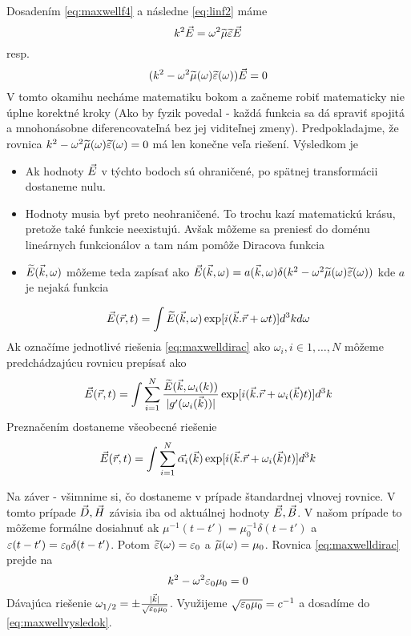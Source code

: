 Dosadením \ref{eq:maxwellf4} a následne \ref{eq:linf2} máme
\begin{equation*}
  k^2 \vec{E} = \omega^2 \widetilde{\mu}\widetilde{\varepsilon} \vec{E}    
\end{equation*}
resp.
\begin{equation}
    \label{eq:maxwelldirac}
  (k^2 - \omega^2 \widetilde{\mu}(\omega)\widetilde{\varepsilon}(\omega)) \vec{E} =0
\end{equation}
V tomto okamihu necháme matematiku bokom a začneme robiť matematicky
nie úplne korektné kroky (Ako by fyzik povedal - každá funkcia sa dá
spraviť spojitá a mnohonásobne diferencovateľná bez jej viditeľnej
zmeny). Predpokladajme, že rovnica 
  $k^2 - \omega^2 \widetilde{\mu}(\omega)\widetilde{\varepsilon}(\omega)=0$ má len
  konečne veľa riešení. Výsledkom je 
\begin{itemize}
\item Ak hodnoty $\vec{E}$ v týchto bodoch sú ohraničené, po spätnej
    transformácii dostaneme nulu.
\item Hodnoty musia byť preto neohraničené. To trochu kazí matematickú
krásu, pretože také funkcie neexistujú. Avšak môžeme sa preniesť do
doménu lineárnych funkcionálov a tam nám pomôže Diracova funkcia
\item $\widetilde{E}{(\vec{k},\omega)}$ môžeme teda zapísať ako $\vec{E}{(\vec{k},\omega)} = a{(\vec{k},\omega)}
\delta( k^2 - \omega^2 \widetilde{\mu}(\omega)\widetilde{\varepsilon}(\omega))$ kde $a$
je nejaká funkcia
\end{itemize}

\begin{equation}
    \vec{E}{(\vec{r},t)} = \int \widetilde{E}{(\vec{k},\omega)} \exp[i (\vec{k}.\vec{r} +
    \omega t)] d^3k d\omega
\end{equation}
Ak označíme jednotlivé riešenia \ref{eq:maxwelldirac} ako $\omega_i, i
\in 1,\dots,N$ môžeme predchádzajúcu rovnicu prepísať ako
\begin{equation}
    \vec{E}{(\vec{r},t)} = \int \sum_{i=1}^N
    \frac{\widetilde{E}(\vec{k},\omega_i(k))}{|g'(\omega_i(\vec{k}))|}
    \exp[i (\vec{k} . \vec{r} + \omega_i(\vec{k}) t)] d^3k
\end{equation}
Preznačením dostaneme všeobecné riešenie
\begin{equation}
    \label{eq:maxwellvysledok}
    \vec{E}{(\vec{r},t)} = \int \sum_{i=1}^N \vec{\alpha_i}(\vec{k})
    \exp[i(\vec{k}.\vec{r} + \omega_i(\vec{k}) t)] d^3 k
\end{equation}

Na záver - všimnime si, čo dostaneme v prípade štandardnej vlnovej
rovnice. V tomto prípade $\vec{D},\vec{H}$ závisia iba od
aktuálnej hodnoty $\vec{E},\vec{B}$. V našom prípade to môžeme
formálne dosiahnuť ak $\mu^{-1}(t-t')=\mu_0^{-1} \delta(t-t')$ a
$\varepsilon(t-t')=\varepsilon_0 \delta(t-t')$.
Potom $\widetilde{\varepsilon}(\omega) = \varepsilon_0$ a $\widetilde{\mu}(\omega)=\mu_0$.
Rovnica \ref{eq:maxwelldirac} prejde na
\begin{equation}
    k^2 - \omega^2 \varepsilon_0 \mu_0 = 0
\end{equation}
Dávajúca riešenie $\omega_{1/2}=\pm \frac{|\vec{k}|}{\sqrt{\varepsilon_0
\mu_0}}$. Využijeme $\sqrt{\varepsilon_0 \mu_0}=c^{-1}$ a dosadíme do
\ref{eq:maxwellvysledok}.

